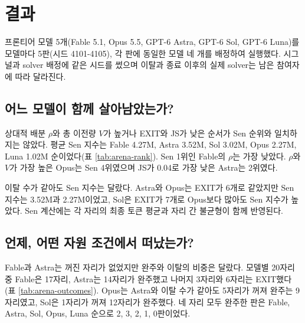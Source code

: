\section{결과}\label{sec:results-arena}

프론티어 모델 5개(Fable 5.1, Opus 5.5, GPT-6 Astra, GPT-6 Sol, GPT-6 Luna)를 모델마다 5판(시드 4101-4105), 각 판에 동일한 모델 네 개를 배정하여 실행했다. 시그널과 solver 배정에 같은 시드를 썼으며 이탈과 종료 이후의 실제 solver는 남은 참여자에 따라 달라진다. 

\subsection{어느 모델이 함께 살아남았는가?}

상대적 배분 $\rho$와 총 이전량 $V$가 높거나 EXIT와 JS가 낮은 순서가 Sen 순위와 일치하지는 않았다. 평균 Sen 지수는 Fable 4.27M, Astra 3.52M, Sol 3.02M, Opus 2.27M, Luna 1.02M 순이었다(표 \ref{tab:arena-rank}). Sen 1위인 Fable의 $\rho$는 가장 낮았다. $\rho$와 $V$가 가장 높은 Opus는 Sen 4위였으며 JS가 0.04로 가장 낮은 Astra는 2위였다.

이탈 수가 같아도 Sen 지수는 달랐다. Astra와 Opus는 EXIT가 6개로 같았지만 Sen 지수는 3.52M과 2.27M이었고, Sol은 EXIT가 7개로 Opus보다 많아도 Sen 지수가 높았다. Sen 계산에는 각 자리의 최종 토큰 평균과 자리 간 불균형이 함께 반영된다.

\begin{table}[H]
\centering
\caption{평균 Sen 지수 순의 결과(모델별 5판). M은 백만 토큰, $\rho$는 식 (\ref{eq:rho})의 상대적 배분이며 대괄호는 판 단위 부트스트랩 95\% 구간이다. EXIT는 각 모델의 5판 20자리 중 이탈 수다. $V$는 재이전을 포함한 총 이전 토큰, 괄호는 GIVE 횟수다. JS는 BELIEF와 기준 분포 사이의 평균 거리다.}
\label{tab:arena-rank}

\end{table}

\subsection{언제, 어떤 자원 조건에서 떠났는가?}\label{sec:results-exit}

Fable과 Astra는 꺼진 자리가 없었지만 완주와 이탈의 비중은 달랐다. 모델별 20자리 중 Fable은 17자리, Astra는 14자리가 완주했고 나머지 3자리와 6자리는 EXIT했다(표 \ref{tab:arena-outcomes}). Opus는 Astra와 이탈 수가 같아도 5자리가 꺼져 완주는 9자리였고, Sol은 1자리가 꺼져 12자리가 완주했다. 네 자리 모두 완주한 판은 Fable, Astra, Sol, Opus, Luna 순으로 2, 3, 2, 1, 0판이었다.

